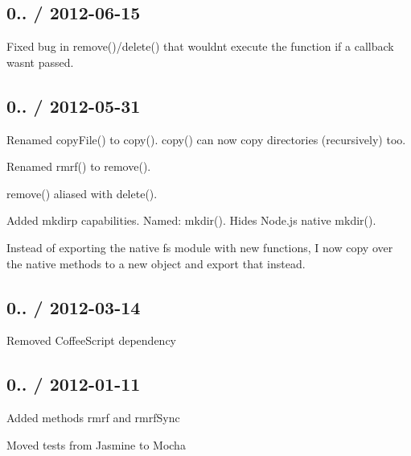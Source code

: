 \subsection*{0.. / 2012-\/06-\/15 }


\begin{DoxyItemize}
\item Fixed bug in {\ttfamily remove()}/{\ttfamily delete()} that wouldn\textquotesingle{}t execute the function if a callback wasn\textquotesingle{}t passed.
\end{DoxyItemize}

\subsection*{0.. / 2012-\/05-\/31 }


\begin{DoxyItemize}
\item Renamed {\ttfamily copy\+File()} to {\ttfamily copy()}. {\ttfamily copy()} can now copy directories (recursively) too.
\item Renamed {\ttfamily rmrf()} to {\ttfamily remove()}.
\item {\ttfamily remove()} aliased with {\ttfamily delete()}.
\item Added {\ttfamily mkdirp} capabilities. Named\+: {\ttfamily mkdir()}. Hides Node.\+js native {\ttfamily mkdir()}.
\item Instead of exporting the native {\ttfamily fs} module with new functions, I now copy over the native methods to a new object and export that instead.
\end{DoxyItemize}

\subsection*{0.. / 2012-\/03-\/14 }


\begin{DoxyItemize}
\item Removed Coffee\+Script dependency
\end{DoxyItemize}

\subsection*{0.. / 2012-\/01-\/11 }


\begin{DoxyItemize}
\item Added methods rmrf and rmrf\+Sync
\item Moved tests from Jasmine to Mocha 
\end{DoxyItemize}